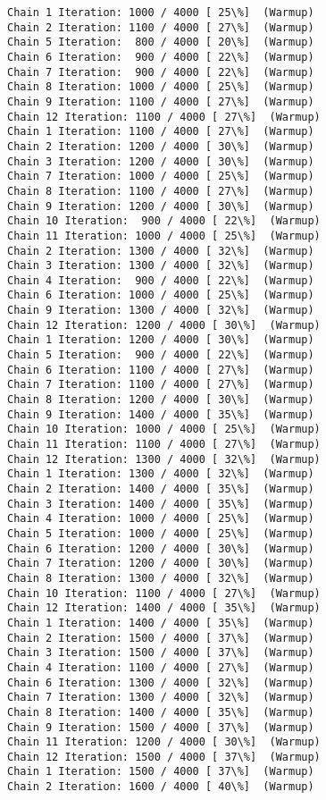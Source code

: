 \documentclass[11pt]{article}
\begin{document}
\begin{Verbatim}[commandchars=\\\{\}]
Chain 1 Iteration: 1000 / 4000 [ 25\%]  (Warmup)
Chain 2 Iteration: 1100 / 4000 [ 27\%]  (Warmup)
Chain 5 Iteration:  800 / 4000 [ 20\%]  (Warmup)
Chain 6 Iteration:  900 / 4000 [ 22\%]  (Warmup)
Chain 7 Iteration:  900 / 4000 [ 22\%]  (Warmup)
Chain 8 Iteration: 1000 / 4000 [ 25\%]  (Warmup)
Chain 9 Iteration: 1100 / 4000 [ 27\%]  (Warmup)
Chain 12 Iteration: 1100 / 4000 [ 27\%]  (Warmup)
Chain 1 Iteration: 1100 / 4000 [ 27\%]  (Warmup)
Chain 2 Iteration: 1200 / 4000 [ 30\%]  (Warmup)
Chain 3 Iteration: 1200 / 4000 [ 30\%]  (Warmup)
Chain 7 Iteration: 1000 / 4000 [ 25\%]  (Warmup)
Chain 8 Iteration: 1100 / 4000 [ 27\%]  (Warmup)
Chain 9 Iteration: 1200 / 4000 [ 30\%]  (Warmup)
Chain 10 Iteration:  900 / 4000 [ 22\%]  (Warmup)
Chain 11 Iteration: 1000 / 4000 [ 25\%]  (Warmup)
Chain 2 Iteration: 1300 / 4000 [ 32\%]  (Warmup)
Chain 3 Iteration: 1300 / 4000 [ 32\%]  (Warmup)
Chain 4 Iteration:  900 / 4000 [ 22\%]  (Warmup)
Chain 6 Iteration: 1000 / 4000 [ 25\%]  (Warmup)
Chain 9 Iteration: 1300 / 4000 [ 32\%]  (Warmup)
Chain 12 Iteration: 1200 / 4000 [ 30\%]  (Warmup)
Chain 1 Iteration: 1200 / 4000 [ 30\%]  (Warmup)
Chain 5 Iteration:  900 / 4000 [ 22\%]  (Warmup)
Chain 6 Iteration: 1100 / 4000 [ 27\%]  (Warmup)
Chain 7 Iteration: 1100 / 4000 [ 27\%]  (Warmup)
Chain 8 Iteration: 1200 / 4000 [ 30\%]  (Warmup)
Chain 9 Iteration: 1400 / 4000 [ 35\%]  (Warmup)
Chain 10 Iteration: 1000 / 4000 [ 25\%]  (Warmup)
Chain 11 Iteration: 1100 / 4000 [ 27\%]  (Warmup)
Chain 12 Iteration: 1300 / 4000 [ 32\%]  (Warmup)
Chain 1 Iteration: 1300 / 4000 [ 32\%]  (Warmup)
Chain 2 Iteration: 1400 / 4000 [ 35\%]  (Warmup)
Chain 3 Iteration: 1400 / 4000 [ 35\%]  (Warmup)
Chain 4 Iteration: 1000 / 4000 [ 25\%]  (Warmup)
Chain 5 Iteration: 1000 / 4000 [ 25\%]  (Warmup)
Chain 6 Iteration: 1200 / 4000 [ 30\%]  (Warmup)
Chain 7 Iteration: 1200 / 4000 [ 30\%]  (Warmup)
Chain 8 Iteration: 1300 / 4000 [ 32\%]  (Warmup)
Chain 10 Iteration: 1100 / 4000 [ 27\%]  (Warmup)
Chain 12 Iteration: 1400 / 4000 [ 35\%]  (Warmup)
Chain 1 Iteration: 1400 / 4000 [ 35\%]  (Warmup)
Chain 2 Iteration: 1500 / 4000 [ 37\%]  (Warmup)
Chain 3 Iteration: 1500 / 4000 [ 37\%]  (Warmup)
Chain 4 Iteration: 1100 / 4000 [ 27\%]  (Warmup)
Chain 6 Iteration: 1300 / 4000 [ 32\%]  (Warmup)
Chain 7 Iteration: 1300 / 4000 [ 32\%]  (Warmup)
Chain 8 Iteration: 1400 / 4000 [ 35\%]  (Warmup)
Chain 9 Iteration: 1500 / 4000 [ 37\%]  (Warmup)
Chain 11 Iteration: 1200 / 4000 [ 30\%]  (Warmup)
Chain 12 Iteration: 1500 / 4000 [ 37\%]  (Warmup)
Chain 1 Iteration: 1500 / 4000 [ 37\%]  (Warmup)
Chain 2 Iteration: 1600 / 4000 [ 40\%]  (Warmup)

\end{Verbatim}
\end{document}
